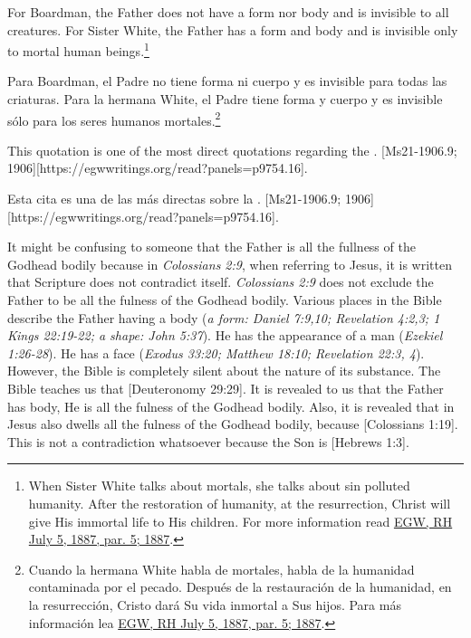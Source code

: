 For Boardman, the Father does not have a form nor body and is invisible to all creatures. For Sister White, the Father has a form and body and is invisible only to mortal human beings.\footnote{When Sister White talks about mortals, she talks about sin polluted humanity. After the restoration of humanity, at the resurrection, Christ will give His immortal life to His children. For more information read \href{https://egwwritings.org/?ref=en_RH.July.5.1887.par.5}{EGW, RH July 5, 1887, par. 5; 1887}.}


Para Boardman, el Padre no tiene forma ni cuerpo y es invisible para todas las criaturas. Para la hermana White, el Padre tiene forma y cuerpo y es invisible sólo para los seres humanos mortales.\footnote{Cuando la hermana White habla de mortales, habla de la humanidad contaminada por el pecado. Después de la restauración de la humanidad, en la resurrección, Cristo dará Su vida inmortal a Sus hijos. Para más información lea \href{https://egwwritings.org/?ref=en_RH.July.5.1887.par.5}{EGW, RH July 5, 1887, par. 5; 1887}.}


This quotation is one of the most direct quotations regarding the . [Ms21-1906.9; 1906][https://egwwritings.org/read?panels=p9754.16].


Esta cita es una de las más directas sobre la . [Ms21-1906.9; 1906][https://egwwritings.org/read?panels=p9754.16].


It might be confusing to someone that the Father is all the fullness of the Godhead bodily because in \textit{Colossians 2:9}, when referring to Jesus, it is written that  Scripture does not contradict itself. \textit{Colossians 2:9} does not exclude the Father to be all the fulness of the Godhead bodily. Various places in the Bible describe the Father having a body (\textit{a form: Daniel 7:9,10; Revelation 4:2,3; 1 Kings 22:19-22; a shape: John 5:37}). He has the appearance of a man (\textit{Ezekiel 1:26-28}). He has a face (\textit{Exodus 33:20; Matthew 18:10; Revelation 22:3, 4}). However, the Bible is completely silent about the nature of its substance. The Bible teaches us that [Deuteronomy 29:29]. It is revealed to us that the Father has body, He is all the fulness of the Godhead bodily. Also, it is revealed that in Jesus also dwells all the fulness of the Godhead bodily, because [Colossians 1:19]. This is not a contradiction whatsoever because the Son is [Hebrews 1:3].


